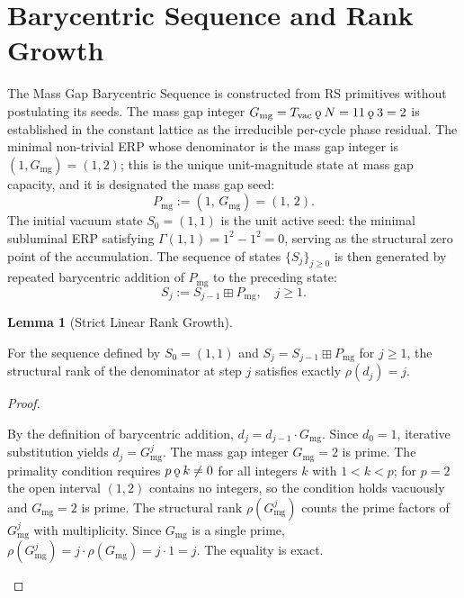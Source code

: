 \documentclass[11pt, letterpaper]{article}
\newcommand{\rank}{\rho}
\newcommand{\koppa}{\mathbin{\text{\rm\k{o}}}}
\newcommand{\bplus}{\boxplus}
\newcommand{\Gmg}{G_{\mathrm{mg}}}
\newcommand{\Tcharge}{\Gamma}
\theoremstyle{definition}
\newtheorem{lemma}{Lemma}[section]
\begin{document}
\section{Barycentric Sequence and Rank Growth}

The Mass Gap Barycentric Sequence is constructed from RS primitives without postulating its seeds. The mass gap integer $\Gmg = T_{\mathrm{vac}} \koppa N = 11 \koppa 3 = 2$ is established in the constant lattice as the irreducible per-cycle phase residual. The minimal non-trivial ERP whose denominator is the mass gap integer is $(1, \Gmg) = (1, 2)$; this is the unique unit-magnitude state at mass gap capacity, and it is designated the mass gap seed:
\[
P_{\mathrm{mg}} := (1,\, \Gmg) = (1,\, 2).
\]
The initial vacuum state $S_0 = (1, 1)$ is the unit active seed: the minimal subluminal ERP satisfying $\Tcharge(1,1) = 1^2 - 1^2 = 0$, serving as the structural zero point of the accumulation. The sequence of states $\{S_j\}_{j \ge 0}$ is then generated by repeated barycentric addition of $P_{\mathrm{mg}}$ to the preceding state:
\[
S_j := S_{j-1} \bplus P_{\mathrm{mg}}, \quad j \ge 1.
\]

\begin{lemma}[Strict Linear Rank Growth]
\begin{rsbox}
For the sequence defined by $S_0 = (1, 1)$ and $S_j = S_{j-1} \bplus P_{\mathrm{mg}}$ for $j \ge 1$, the structural rank of the denominator at step $j$ satisfies exactly $\rank(d_j) = j$.
\end{rsbox}
\begin{proof}
\begin{rsbox}
By the definition of barycentric addition, $d_j = d_{j-1} \cdot \Gmg$. Since $d_0 = 1$, iterative substitution yields $d_j = \Gmg^j$.
The mass gap integer $\Gmg = 2$ is prime. The primality condition requires $p \koppa k \neq 0$ for all integers $k$ with $1 < k < p$; for $p = 2$ the open interval $(1, 2)$ contains no integers, so the condition holds vacuously and $\Gmg = 2$ is prime.
The structural rank $\rank(\Gmg^j)$ counts the prime factors of $\Gmg^j$ with multiplicity. Since $\Gmg$ is a single prime, $\rank(\Gmg^j) = j \cdot \rank(\Gmg) = j \cdot 1 = j$. The equality is exact.
\end{rsbox}
\end{proof}
\end{lemma}
\end{document}
